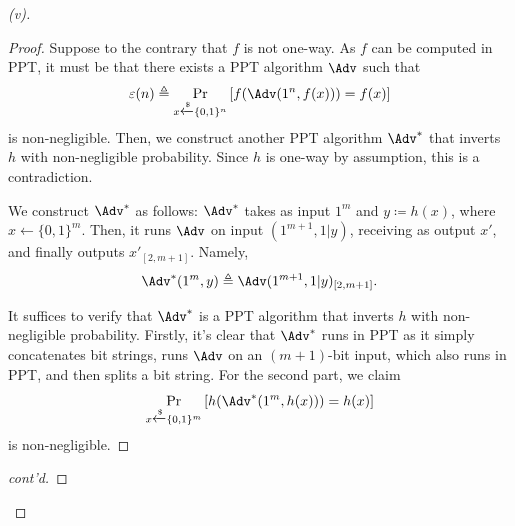 \begin{proof}[(v)]
\begin{proof}
        Suppose to the contrary that $f$ is not one-way. As $f$ can be computed in PPT, it must be that there exists a PPT algorithm $\Adv$ such that
        \[
        \varepsilon(n)\triangleq \Pr_{x\xleftarrow{\$}\{0,1\}^n}\left[f(\Adv(1^n, f(x))) = f(x)\right]
        \]
        is non-negligible. Then, we construct another PPT algorithm $\Adv^\ast$ that inverts $h$ with non-negligible probability. Since $h$ is one-way by assumption, this is a contradiction.
    
        We construct $\Adv^\ast$ as follows: $\Adv^\ast$ takes as input $1^{m}$ and $y\coloneq h(x)$, where $x\xleftarrow{}\{0,1\}^m$. Then, it runs $\Adv$ on input $(1^{m+1}, 1|y)$, receiving as output $x'$, and finally outputs $x'_{[2, m+1]}$. Namely,
        \[
        \Adv^\ast(1^{m}, y) \triangleq \Adv(1^{m+1}, 1|y)_{[2,m+1]}.
        \]
        
        It suffices to verify that $\Adv^\ast$ is a PPT algorithm that inverts $h$ with non-negligible probability. Firstly, it's clear that $\Adv^\ast$ runs in PPT as it simply concatenates bit strings, runs $\Adv$ on an $(m+1)$-bit input, which also runs in PPT, and then splits a bit string. For the second part, we claim
        \[
        \Pr_{x\xleftarrow{\$}\{0,1\}^m}\left[h(\Adv^\ast(1^m, h(x))) = h(x)\right]
        \]
        is non-negligible. 
        
        \end{proof}\begin{proof}[cont'd]
        

\end{proof}
\end{proof}
